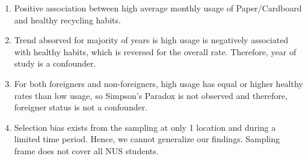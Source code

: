 \documentclass[12pt, a4paper]{article}
\begin{document}
\begin{enumerate}[Q\arabic*.]
\begin{enumerate}[(\alph*.)]
    \item Positive association between high average monthly usage of Paper/Cardboard and healthy recycling habits.

    \item Trend absorved for majority of years is high usage is negatively associated with healthy habits, which is reversed for the overall rate. Therefore, year of study is a confounder. 

    \item For both foreigners and non-foreigners, high usage has equal or higher healthy rates than low usage, so Simpson's Paradox is not observed and therefore, foreigner status is not a confounder.

    \item Selection bias exists from the sampling at only 1 location and during a limited time period. Hence, we cannot generalize our findings. Sampling frame does not cover all NUS students.
    \end{enumerate}
\end{enumerate}
\end{document}
